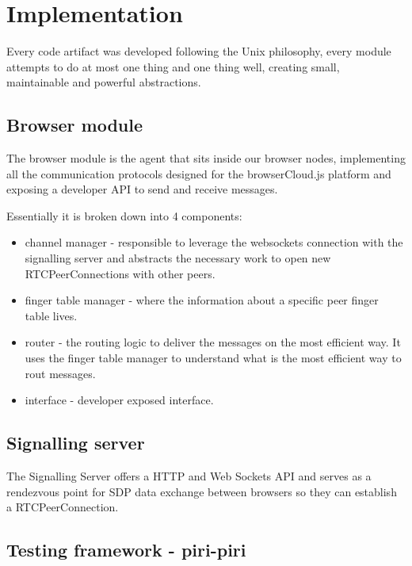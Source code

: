 
%
%

\section{Implementation}

Every code artifact was developed following the Unix philosophy, every module attempts to do at most one thing and one thing well, creating small, maintainable and powerful abstractions.

\subsection{Browser module}

The browser module is the agent that sits inside our browser nodes, implementing all the communication protocols designed for the browserCloud.js platform and exposing a developer API to send and receive messages.

Essentially it is broken down into 4 components:

\begin{itemize}
    \item channel manager - responsible to leverage the websockets connection with the signalling server and abstracts the necessary work to open new RTCPeerConnections with other peers.
    \item finger table manager - where the information about a specific peer finger table lives.
    \item router - the routing logic to deliver the messages on the most efficient way. It uses the finger table manager to understand what is the most efficient way to rout messages.
    \item interface - developer exposed interface.
\end{itemize}

\subsection{Signalling server}

The Signalling Server offers a HTTP and Web Sockets API and serves as a rendezvous point for SDP data exchange between browsers so they can establish a RTCPeerConnection. 

\subsection{Testing framework - piri-piri}

